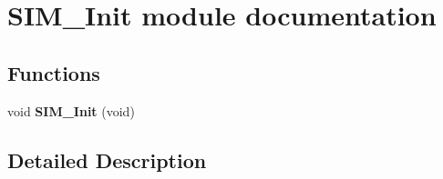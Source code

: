 \hypertarget{group___s_i_m___init__module}{}\section{S\+I\+M\+\_\+\+Init module documentation}
\label{group___s_i_m___init__module}
\subsection*{Functions}
\begin{DoxyCompactItemize}
\item 
void {\bfseries S\+I\+M\+\_\+\+Init} (void)\hypertarget{group___s_i_m___init__module_gad398271b88c3e6616f8f9258787c29a3}{}\label{group___s_i_m___init__module_gad398271b88c3e6616f8f9258787c29a3}

\end{DoxyCompactItemize}


\subsection{Detailed Description}
